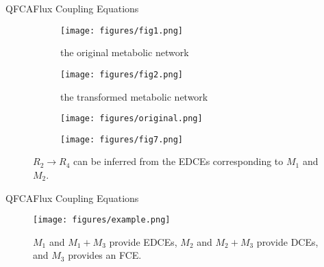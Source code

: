 \documentclass[10pt]{beamer}
\theoremstyle{remark}
\theoremstyle{definition}
\begin{document}
\begin{frame}{QFCA}{Flux Coupling Equations}

\begin{figure}[ht]
    \centering
    \begin{subfigure}[b]{0.45\textwidth}
        \texttt{[image: figures/fig1.png]}
        \caption{the original metabolic network}
    \end{subfigure}
    \qquad
    \begin{subfigure}[b]{0.45\textwidth}
        \texttt{[image: figures/fig2.png]}
        \caption{the transformed metabolic network}
    \end{subfigure}
    \begin{subfigure}[b]{0.45\textwidth}
        \texttt{[image: figures/original.png]}
    \end{subfigure}
    \qquad
    \begin{subfigure}[b]{0.45\textwidth}
        \texttt{[image: figures/fig7.png]}
    \end{subfigure}
    \caption{$R_2 \longrightarrow R_4$ can be inferred from the EDCEs corresponding to $M_1$ and $M_2$.}
\end{figure} 
\end{frame}

\begin{frame}{QFCA}{Flux Coupling Equations}

\begin{figure}[ht]
	\centerline{\texttt{[image: figures/example.png]}}
	\caption{$M_1$ and $M_1 + M_3$ provide EDCEs, $M_2$ and $M_2+M_3$ provide DCEs, and $M_3$ provides an FCE.}
\end{figure} 
\end{frame}

\end{document}
